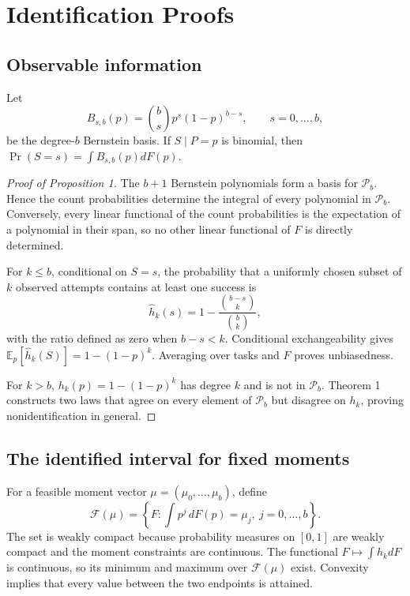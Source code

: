 \documentclass[twoside]{article}
\newcommand{\E}{\mathbb E}
\newcommand{\Pcal}{\mathcal P}
\begin{document}

\section{Identification Proofs}

\subsection{Observable information}

Let
\[
 B_{s,b}(p)=\binom bs p^s(1-p)^{b-s},
 \qquad s=0,\ldots,b,
\]
be the degree-\(b\) Bernstein basis. If \(S\mid P=p\) is binomial, then
\(\Pr(S=s)=\int B_{s,b}(p)dF(p)\).

\begin{proof}[Proof of Proposition 1]
The \(b+1\) Bernstein polynomials form a basis for \(\Pcal_b\). Hence the
count probabilities determine the integral of every polynomial in
\(\Pcal_b\). Conversely, every linear functional of the count probabilities
is the expectation of a polynomial in their span, so no other linear
functional of \(F\) is directly determined.

For \(k\leq b\), conditional on \(S=s\), the probability that a uniformly
chosen subset of \(k\) observed attempts contains at least one success is
\[
 \widehat h_k(s)=1-\frac{\binom{b-s}{k}}{\binom bk},
\]
with the ratio defined as zero when \(b-s<k\). Conditional exchangeability
gives \(\E_p[\widehat h_k(S)]=1-(1-p)^k\). Averaging over tasks and \(F\)
proves unbiasedness.

For \(k>b\), \(h_k(p)=1-(1-p)^k\) has degree \(k\) and is not in
\(\Pcal_b\). Theorem 1 constructs two laws that agree on every element of
\(\Pcal_b\) but disagree on \(h_k\), proving nonidentification in general.
\end{proof}

\subsection{The identified interval for fixed moments}

For a feasible moment vector
\(\mu=(\mu_0,\ldots,\mu_b)\), define
\[
 \mathcal F(\mu)=
 \left\{F:\int p^j\,dF(p)=\mu_j,\ j=0,\ldots,b\right\}.
\]
The set is weakly compact because probability measures on \([0,1]\) are
weakly compact and the moment constraints are continuous. The functional
\(F\mapsto\int h_kdF\) is continuous, so its minimum and maximum over
\(\mathcal F(\mu)\) exist. Convexity implies that every value between the
two endpoints is attained.
\end{document}
